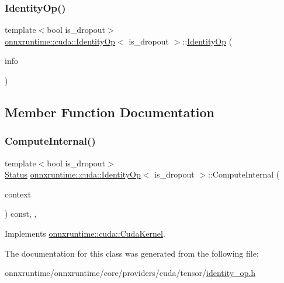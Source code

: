 \subsubsection{\texorpdfstring{Identity\+Op()}{IdentityOp()}}
{\footnotesize\ttfamily template$<$bool is\+\_\+dropout$>$ \\
\mbox{\hyperlink{classonnxruntime_1_1cuda_1_1IdentityOp}{onnxruntime\+::cuda\+::\+Identity\+Op}}$<$ is\+\_\+dropout $>$\+::\mbox{\hyperlink{classonnxruntime_1_1cuda_1_1IdentityOp}{Identity\+Op}} (\begin{DoxyParamCaption}\item[{const \mbox{\hyperlink{classonnxruntime_1_1OpKernelInfo}{Op\+Kernel\+Info}} \&}]{info }\end{DoxyParamCaption})\hspace{0.3cm}{\ttfamily [inline]}}



\subsection{Member Function Documentation}
\mbox{\label{classonnxruntime_1_1cuda_1_1IdentityOp_aebedebb3ee26d00443c2c6d8b6f8e3c3}} 
\subsubsection{\texorpdfstring{Compute\+Internal()}{ComputeInternal()}}
{\footnotesize\ttfamily template$<$bool is\+\_\+dropout$>$ \\
\mbox{\hyperlink{classonnxruntime_1_1common_1_1Status}{Status}} \mbox{\hyperlink{classonnxruntime_1_1cuda_1_1IdentityOp}{onnxruntime\+::cuda\+::\+Identity\+Op}}$<$ is\+\_\+dropout $>$\+::Compute\+Internal (\begin{DoxyParamCaption}\item[{\mbox{\hyperlink{classonnxruntime_1_1OpKernelContext}{Op\+Kernel\+Context}} $\ast$}]{context }\end{DoxyParamCaption}) const\hspace{0.3cm}{\ttfamily [inline]}, {\ttfamily [override]}, {\ttfamily [virtual]}}



Implements \mbox{\hyperlink{classonnxruntime_1_1cuda_1_1CudaKernel_aca7af04ae448017d6023d30bba231ebb}{onnxruntime\+::cuda\+::\+Cuda\+Kernel}}.



The documentation for this class was generated from the following file\+:\begin{DoxyCompactItemize}
\item 
onnxruntime/onnxruntime/core/providers/cuda/tensor/\mbox{\hyperlink{cuda_2tensor_2identity__op_8h}{identity\+\_\+op.\+h}}\end{DoxyCompactItemize}
